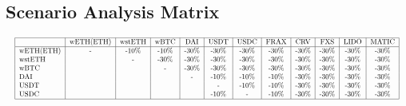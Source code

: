 \documentclass[conference]{IEEEtran}
\begin{document}
\begin{appendices}
\section{Scenario Analysis Matrix}
$$\resizebox{\textwidth}{!}{\begin{tabular}{|l|c|c|c|c|c|c|c|c|c|c|c|c|c|}
  \hline
   & wETH(ETH) & wstETH & wBTC & DAI & USDT & USDC & FRAX & CRV & FXS & LIDO & MATIC \\
  \hline
  wETH(ETH) & - & -10$\%$ & -10$\%$ & -30$\%$ & -30$\%$ & -30$\%$ & -30$\%$ & -30$\%$ & -30$\%$ & -30$\%$ & -30$\%$  \\
  wstETH &  & - & -30$\%$ & -30$\%$ & -30$\%$ & -30$\%$ & -30$\%$ & -30$\%$ & -30$\%$ & -30$\%$ & -30$\%$\\
  wBTC &  &  & - & -30$\%$ & -30$\%$ & -30$\%$ & -30$\%$ & -30$\%$ & -30$\%$ & -30$\%$ & -30$\%$ \\
  DAI &  &  &  & - & -10$\%$ & -10$\%$ & -10$\%$ & -30$\%$ & -30$\%$ & -30$\%$ & -30$\%$ \\
  USDT &  &  &  &  & - & -10$\%$ & -10$\%$ & -30$\%$ & -30$\%$ & -30$\%$ & -30$\%$\\
 USDC &  &  &  &  & -10$\%$ & - & -10$\%$ & -30$\%$ & -30$\%$ & -30$\%$ & -30$\%$\\
  \hline
\end{tabular}}$$
\end{appendices}
\end{document}
